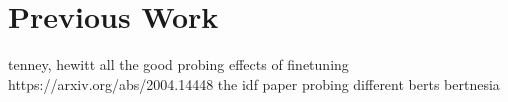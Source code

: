 \chapter{Previous Work}
\label{chap:prev}
tenney, hewitt all the good probing
effects of finetuning https://arxiv.org/abs/2004.14448
the idf paper
probing different berts
bertnesia